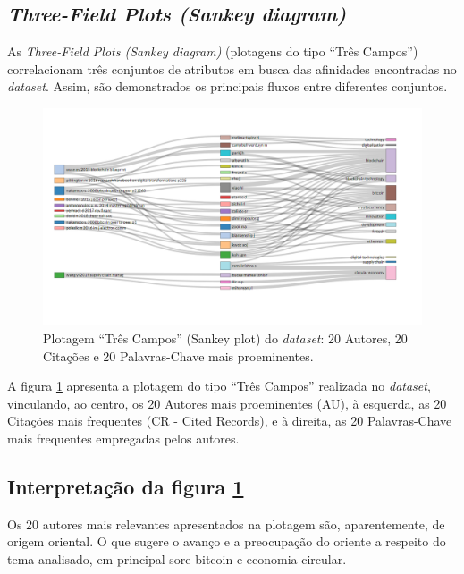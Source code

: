\subsection{\textit{Three-Field Plots (Sankey diagram)}}

As \textit{Three-Field Plots (Sankey diagram)} (plotagens do tipo ``Três Campos'') correlacionam três conjuntos de atributos em busca das afinidades encontradas no \textit{dataset}. Assim, são demonstrados os principais fluxos entre diferentes conjuntos.

\begin{figure}
    \centering
    \includegraphics[width=1\textwidth]{experiments/FernandoCordeiro/AnaliseBibliometrica/Blockchain/Three-Fields_Plot.png}
    \caption{Plotagem ``Três Campos'' (Sankey plot) do \textit{dataset}: 20 Autores, 20 Citações e 20 Palavras-Chave mais proeminentes.}
    \label{fig:BLOCKCHAIN@FernandoCordeiro:ThreeFieldPlot}
\end{figure}

A figura \ref{fig:BLOCKCHAIN@FernandoCordeiro:ThreeFieldPlot} apresenta a plotagem do tipo ``Três Campos'' realizada no \textit{dataset}, vinculando, ao centro, os 20 Autores mais proeminentes (AU), à esquerda, as 20 Citações mais frequentes (CR - Cited Records), e à direita, as 20 Palavras-Chave mais frequentes empregadas pelos autores.

\subsection{Interpretação da figura \ref{fig:BLOCKCHAIN@FernandoCordeiro:ThreeFieldPlot}}
Os 20 autores mais relevantes apresentados na plotagem são, aparentemente, de origem oriental. O que sugere o avanço e a preocupação do oriente a respeito do tema analisado, em principal sore bitcoin e economia circular.

